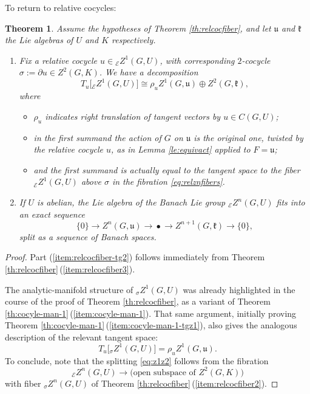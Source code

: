 \documentclass[pdftex]{sigma}
\numberwithin{equation}{section}
\newtheorem{Theorem}{Theorem}[section]
\newcommand\cE{{\mathcal E}}
\newcommand\fk{{\mathfrak k}}
\newcommand\fu{{\mathfrak u}}
\begin{document}
To return to relative cocycles:

\begin{Theorem}\label{th:relcocfiber-tg}
 Assume the hypotheses of Theorem {\rm \ref{th:relcocfiber}}, and let $\fu$ and $\fk$ the Lie algebras of $U$ and $K$ respectively.
 \begin{enumerate}[$(1)$]\itemsep=0pt

 \item\label{item:relcocfiber-tg1} Fix a relative cocycle $u\in {}_{\cE}Z^1(G,U)$, with corresponding $2$-cocycle $\sigma:=\partial u\in Z^2(G,K)$. We have a decomposition
 \begin{equation}\label{eq:z1z2}
 T_{u}\big[{}_{\cE}Z^1(G,U)\big]
 \cong
 \rho_{u} Z^1(G,\fu)
 \oplus
 Z^2(G,\fk),
 \end{equation}
 where
 \begin{itemize}\itemsep=0pt
 \item $\rho_{u}$ indicates right translation of tangent vectors by ${u}\in C(G,U)$;
 \item in the first summand the action of $G$ on $\fu$ is the original one, twisted by the relative cocycle $u$, as in Lemma {\rm \ref{le:equivact}} applied to $F=\fu$;
 \item and the first summand is actually {\it equal} to the tangent space to the fiber ${}_{\cE}Z^1(G,U)$ above $\sigma$ in the fibration \eqref{eq:relznfibers}.
 \end{itemize}


 \item\label{item:relcocfiber-tg2} If $U$ is abelian, the Lie algebra of the Banach Lie group ${}_{\cE}Z^n(G,U)$ fits into an exact sequence
 \begin{equation*}
 \{0\}\to
 Z^n(G,\fu)
 \xrightarrow{\quad}
 \bullet
 \xrightarrow{\quad}
 Z^{n+1}(G,\fk)
 \to\{0\},
 \end{equation*}
 split as a sequence of Banach spaces.
 \end{enumerate}
\end{Theorem}
\begin{proof}
 Part (\ref{item:relcocfiber-tg2}) follows immediately from Theorem \ref{th:relcocfiber}\,(\ref{item:relcocfiber3}).

 The analytic-manifold structure of ${}_{\sigma}Z^1(G,U)$ was already highlighted in the course of the proof of Theorem \ref{th:relcocfiber}, as a variant of Theorem \ref{th:cocyle-man-1}\,(\ref{item:cocyle-man-1}). That same argument, initially proving Theorem \ref{th:cocyle-man-1}\,(\ref{item:cocyle-man-1-tgz1}), also gives the analogous description of the relevant tangent space:
 \begin{equation}\label{eq:turelz1}
 T_u\big[{}_{\sigma}Z^1(G,U)\big] = \rho_{u} Z^1(G,\fu).
 \end{equation}
 To conclude, note that the splitting \eqref{eq:z1z2} follows from the fibration
 \begin{equation*}
 {}_{\cE}Z^n(G,U)\xrightarrow{\quad}\big(\text{open subspace of }Z^2(G,K)\big)
 \end{equation*}
 with fiber ${}_{\sigma}Z^n(G,U)$ of Theorem \ref{th:relcocfiber}\,(\ref{item:relcocfiber2}).
\end{proof}
\end{document}

